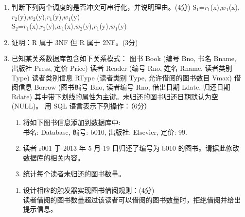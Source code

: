\documentclass{ctexart} %
\begin{document}
\begin{enumerate}[label=\arabic*., resume] %
    \item %
    判断下列两个调度的是否冲突可串行化，并说明理由。(4分)
    S$_1$={$r_1$(x),$w_1$(x),$r_2$(y),$w_2$(y),$r_1$(y),$w_1$(y)} \\ %
    S$_2$={$r_1$(x),$r_2$(y),$w_1$(x),$w_2$(y),$r_1$(y),$w_1$(y)} %

    \item 证明：R 属于 3NF 但 R 属于 2NF。(3分) %

    \item 已知某关系数据库包含如下关系模式：
    图书 Book (编号 Bno, 书名 Bname, 出版社 Press, 定价 Price)
    读者 Reader (编号 Rno, 姓名 Rname, 读者类别 Type)
    读者类别信息 RType (读者类别 Type, 允许借阅的图书数目 Vmax)
    借阅信息 Borrow (图书编号 Bno, 读者编号 Rno, 借出日期 Ldate, 归还日期 Rdate)
    其中带下划线的属性为主键。未归还的图书归还日期默认为空 (NULL)。
    用 SQL 语言表示下列操作：（6分）
    \begin{enumerate}[label=(\arabic*)] %
        \item 将如下图书信息添加到数据库中: \\
        书名: Database, 编号: b010, 出版社: Elsevier, 定价: 99.
        \item 读者 r001 于 2013 年 5 月 19 日归还了编号为 b010 的图书。请据此修改数据库的相关内容。
        \item 统计每个读者未归还的图书数量。
    \end{enumerate}
    \begin{enumerate}[label=(\arabic*), resume] %
        \item 设计相应的触发器实现图书借阅规则：(4分) \\
        读者借阅的图书数量超过该读者可以借阅的图书数量时，拒绝借阅并给出提示信息。
    \end{enumerate}
\end{enumerate}

\vspace{2em} %
\end{document}
